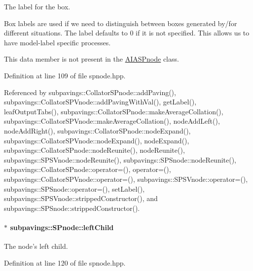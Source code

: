 \-The label for the box. 

\-Box labels are used if we need to distinguish between boxes generated by/for different situations. \-The label defaults to 0 if it is not specified. \-This allows us to have model-\/label specific processes.

\-This data member is not present in the \hyperlink{classAIASPnode}{\-A\-I\-A\-S\-Pnode} class. 

\-Definition at line 109 of file spnode.\-hpp.



\-Referenced by subpavings\-::\-Collator\-S\-Pnode\-::add\-Paving(), subpavings\-::\-Collator\-S\-P\-Vnode\-::add\-Paving\-With\-Val(), get\-Label(), leaf\-Output\-Tabs(), subpavings\-::\-Collator\-S\-Pnode\-::make\-Average\-Collation(), subpavings\-::\-Collator\-S\-P\-Vnode\-::make\-Average\-Collation(), node\-Add\-Left(), node\-Add\-Right(), subpavings\-::\-Collator\-S\-Pnode\-::node\-Expand(), subpavings\-::\-Collator\-S\-P\-Vnode\-::node\-Expand(), node\-Expand(), subpavings\-::\-Collator\-S\-Pnode\-::node\-Reunite(), node\-Reunite(), subpavings\-::\-S\-P\-S\-Vnode\-::node\-Reunite(), subpavings\-::\-S\-P\-Snode\-::node\-Reunite(), subpavings\-::\-Collator\-S\-Pnode\-::operator=(), operator=(), subpavings\-::\-Collator\-S\-P\-Vnode\-::operator=(), subpavings\-::\-S\-P\-S\-Vnode\-::operator=(), subpavings\-::\-S\-P\-Snode\-::operator=(), set\-Label(), subpavings\-::\-S\-P\-S\-Vnode\-::stripped\-Constructor(), and subpavings\-::\-S\-P\-Snode\-::stripped\-Constructor().

\hypertarget{classsubpavings_1_1SPnode_a5c047856140d3143bec18abc584c2646}{
\paragraph[{left\-Child}]{$\ast$ {\bf subpavings\-::\-S\-Pnode\-::left\-Child}}}\label{classsubpavings_1_1SPnode_a5c047856140d3143bec18abc584c2646}


\-The node's left child. 



\-Definition at line 120 of file spnode.\-hpp.



